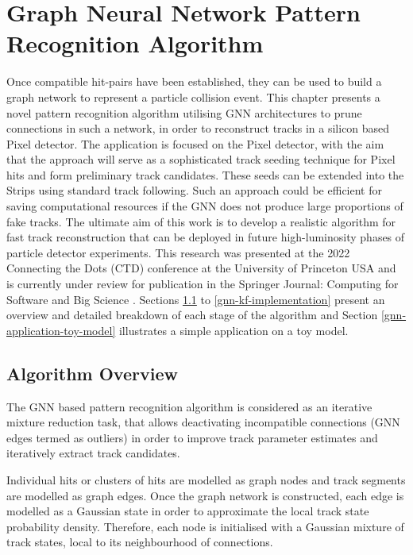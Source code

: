 
\chapter{Graph Neural Network Pattern Recognition Algorithm}\label{chapter-5}

Once compatible hit-pairs have been established, they can be used to build a graph network to represent a particle collision event. This chapter presents a novel pattern recognition algorithm utilising GNN architectures to prune connections in such a network, in order to reconstruct tracks in a silicon based Pixel detector. The application is focused on the Pixel detector, with the aim that the approach will serve as a sophisticated track seeding technique for Pixel hits and form preliminary track candidates. These seeds can be extended into the Strips using standard track following. Such an approach could be efficient for saving computational resources if the GNN does not produce large proportions of fake tracks. The ultimate aim of this work is to develop a realistic algorithm for fast track reconstruction that can be deployed in future high-luminosity phases of particle detector experiments. This research was presented at the 2022 Connecting the Dots (CTD) conference at the University of Princeton USA and is currently under review for publication in the Springer Journal: Computing for Software and Big Science \cite{Lad_2023_gnn}. Sections \ref{gnn-algorithm-overview} to \ref{gnn-kf-implementation} present an overview and detailed breakdown of each stage of the algorithm and Section \ref{gnn-application-toy-model} illustrates a simple application on a toy model.



\section{Algorithm Overview}
\label{gnn-algorithm-overview}
The GNN based pattern recognition algorithm is considered as an iterative mixture reduction task, that allows deactivating incompatible connections (GNN edges termed as outliers) in order to improve track parameter estimates and iteratively extract track candidates. 

Individual hits or clusters of hits are modelled as graph nodes and track segments are modelled as graph edges. Once the graph network is constructed, each edge is modelled as a Gaussian state in order to approximate the local track state probability density. Therefore, each node is initialised with a Gaussian mixture of track states, local to its neighbourhood of connections.

